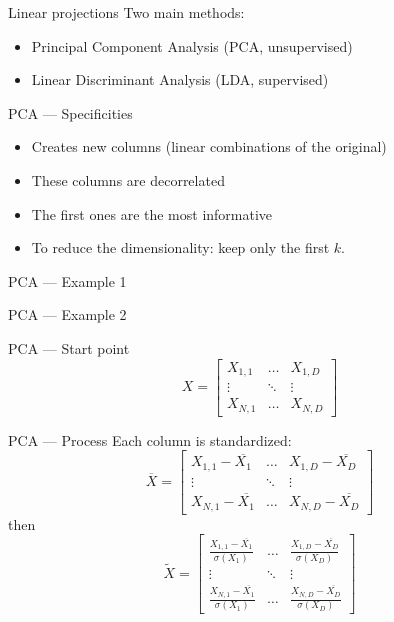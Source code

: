 \begin{frame}{Linear projections}
  Two main methods:
  \begin{itemize}
    \item Principal Component Analysis (PCA, unsupervised)
    \item Linear Discriminant Analysis (LDA, supervised)
  \end{itemize}
\end{frame}

\begin{frame}{PCA --- Specificities}
  \begin{itemize}
    \item Creates new columns (linear combinations of the original)
    \item These columns are decorrelated
    \item The first ones are the most informative
    \item To reduce the dimensionality: keep only the first $k$.
  \end{itemize}
\end{frame}

\begin{frame}{PCA --- Example 1}
\end{frame}

\begin{frame}{PCA --- Example 2}
\end{frame}

\begin{frame}{PCA --- Start point}
  \[
  X = \begin{bmatrix}
    X_{1,1} & \dots  & X_{1,D} \\
    \vdots & \ddots & \vdots \\
    X_{N,1} & \dots  & X_{N,D}
  \end{bmatrix}
  \]
\end{frame}

\begin{frame}{PCA --- Process}
  Each column is standardized:
  \[
  \overline{X} =
  \begin{bmatrix}
    X_{1,1}-\overline{X_1} & \dots  & X_{1,D}-\overline{X_D} \\
    \vdots & \ddots & \vdots \\
    X_{N,1}-\overline{X_1} & \dots  & X_{N,D}-\overline{X_D}
  \end{bmatrix}
  \]
then
  \[
  \widetilde{X} =
  \begin{bmatrix}
    \frac{X_{1,1}-\overline{X_1}}{\sigma(X_1)} & \dots  & \frac{X_{1,D}-\overline{X_D}}{\sigma(X_D)} \\
    \vdots & \ddots & \vdots \\
    \frac{X_{N,1}-\overline{X_1}}{\sigma(X_1)} & \dots  & \frac{X_{N,D}-\overline{X_D}}{\sigma(X_D)}
  \end{bmatrix}
  \]
\end{frame}

